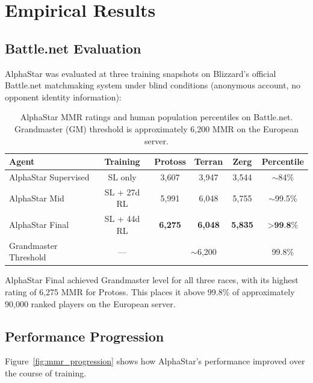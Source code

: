 \documentclass[11pt,a4paper]{article}
\begin{document}
\section{Empirical Results}

\subsection{Battle.net Evaluation}

AlphaStar was evaluated at three training snapshots on Blizzard's official Battle.net matchmaking system under blind conditions (anonymous account, no opponent identity information):

\begin{table}[H]
\centering
\caption{AlphaStar MMR ratings and human population percentiles on Battle.net. Grandmaster (GM) threshold is approximately 6,200 MMR on the European server.}
\label{tab:results}
\begin{tabular}{@{}lccccc@{}}
\toprule
\textbf{Agent} & \textbf{Training} & \textbf{Protoss} & \textbf{Terran} & \textbf{Zerg} & \textbf{Percentile} \\
\midrule
AlphaStar Supervised & SL only & 3,607 & 3,947 & 3,544 & $\sim$84\% \\
AlphaStar Mid & SL + 27d RL & 5,991 & 6,048 & 5,755 & $\sim$99.5\% \\
AlphaStar Final & SL + 44d RL & \textbf{6,275} & \textbf{6,048} & \textbf{5,835} & $>\textbf{99.8\%}$ \\
\midrule
Grandmaster Threshold & --- & \multicolumn{3}{c}{$\sim$6,200} & 99.8\% \\
\bottomrule
\end{tabular}
\end{table}

AlphaStar Final achieved Grandmaster level for all three races, with its highest rating of 6,275 MMR for Protoss. This places it above 99.8\% of approximately 90,000 ranked players on the European server.

\subsection{Performance Progression}

Figure~\ref{fig:mmr_progression} shows how AlphaStar's performance improved over the course of training.
\end{document}

